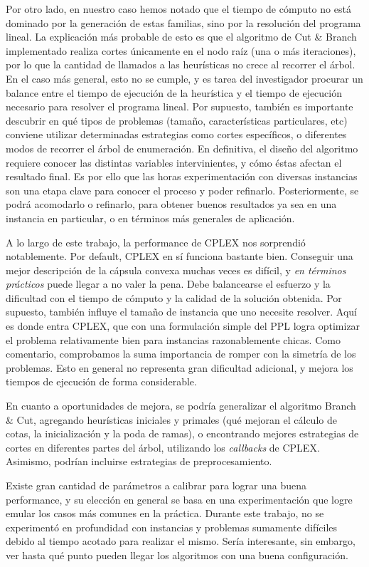 Por otro lado, en nuestro caso hemos notado que el tiempo de cómputo no está dominado por la generación de estas familias, sino por la resolución del programa lineal. La explicación más probable de esto es que el algoritmo de Cut \& Branch implementado realiza cortes únicamente en el nodo raíz (una o más iteraciones), por lo que la cantidad de llamados a las heurísticas no crece al recorrer el árbol. En el caso más general, esto no se cumple, y es tarea del investigador procurar un balance entre el tiempo de ejecución de la heurística y el tiempo de ejecución necesario para resolver el programa lineal. Por supuesto, también es importante descubrir en qué tipos de problemas (tamaño, características particulares, etc) conviene utilizar determinadas estrategias como cortes específicos, o diferentes modos de recorrer el árbol de enumeración. En definitiva, el diseño del algoritmo requiere conocer las distintas variables intervinientes, y cómo éstas afectan el resultado final. Es por ello que las horas experimentación con diversas instancias son una etapa clave para conocer el proceso y poder refinarlo. Posteriormente, se podrá acomodarlo o refinarlo, para obtener buenos resultados ya sea en una instancia en particular, o en términos más generales de aplicación.

A lo largo de este trabajo, la performance de CPLEX nos sorprendió notablemente. Por default, CPLEX en sí funciona bastante bien. Conseguir una mejor descripción de la cápsula convexa muchas veces es difícil, y \textit{en términos prácticos} puede llegar a no valer la pena. Debe balancearse el esfuerzo y la dificultad con el tiempo de cómputo y la calidad de la solución obtenida. Por supuesto, también influye el tamaño de instancia que uno necesite resolver. Aquí es donde entra CPLEX, que con una formulación simple del PPL logra optimizar el problema relativamente bien para instancias razonablemente chicas. Como comentario, comprobamos la suma importancia de romper con la simetría de los problemas. Esto en general no representa gran dificultad adicional, y mejora los tiempos de ejecución de forma considerable.

En cuanto a oportunidades de mejora, se podría generalizar el algoritmo Branch \& Cut, agregando heurísticas iniciales y primales (qué mejoran el cálculo de cotas, la inicialización y la poda de ramas), o encontrando mejores estrategias de cortes en diferentes partes del árbol, utilizando los \textit{callbacks} de CPLEX. Asimismo, podrían incluirse estrategias de preprocesamiento.

Existe gran cantidad de parámetros a calibrar para lograr una buena performance, y su elección en general se basa en una experimentación que logre emular los casos más comunes en la práctica. Durante este trabajo, no se experimentó en profundidad con instancias y problemas sumamente difíciles debido al tiempo acotado para realizar el mismo. Sería interesante, sin embargo, ver hasta qué punto pueden llegar los algoritmos con una buena configuración.